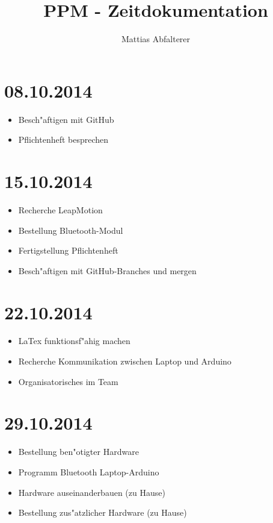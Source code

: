 \documentclass[11pt,a4paper]{article}
\begin{document}
\title{PPM - Zeitdokumentation}
\author{Mattias Abfalterer}
\maketitle

\vfill
\pagebreak


\section*{08.10.2014}

\begin{itemize}
\item Besch"aftigen mit GitHub
\item Pflichtenheft besprechen
\end{itemize}



\section*{15.10.2014}

\begin{itemize}
\item Recherche LeapMotion
\item Bestellung Bluetooth-Modul
\item Fertigstellung Pflichtenheft
\item Besch"aftigen mit GitHub-Branches und mergen
\end{itemize}



\section*{22.10.2014}

\begin{itemize}
\item LaTex funktionsf"ahig machen
\item Recherche Kommunikation zwischen Laptop und Arduino
\item Organisatorisches im Team
\end{itemize}



\section*{29.10.2014}

\begin{itemize}
\item Bestellung ben"otigter Hardware
\item Programm Bluetooth Laptop-Arduino
\item Hardware auseinanderbauen (zu Hause)
\item Bestellung zus"atzlicher Hardware (zu Hause)
\end{itemize}
\end{document}
